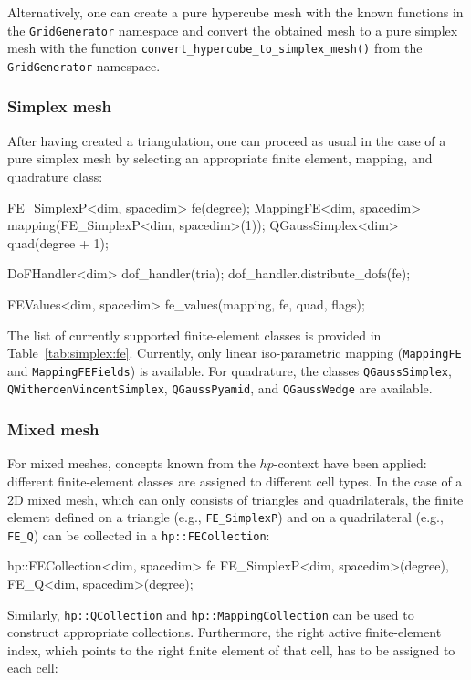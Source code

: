 \documentclass{ansarticle-preprint}
\begin{document}
Alternatively, one can create a pure hypercube mesh with the known functions
in the \texttt{GridGenerator} namespace and convert the obtained mesh to a
pure simplex mesh with the function 
\texttt{convert\_\allowbreak hypercube\_\allowbreak to\_\allowbreak simplex\_\allowbreak mesh()} from the \texttt{GridGenerator} namespace.

\subsubsection{Simplex mesh}

After having created a triangulation, one can proceed as usual in the case of
a pure simplex mesh by selecting an appropriate finite element, mapping, and
quadrature class:

\begin{c++}
FE_SimplexP<dim, spacedim> fe(degree);
MappingFE<dim, spacedim> mapping(FE_SimplexP<dim, spacedim>(1));
QGaussSimplex<dim> quad(degree + 1);

DoFHandler<dim> dof_handler(tria);
dof_handler.distribute_dofs(fe);

FEValues<dim, spacedim> fe_values(mapping, fe, quad, flags);
\end{c++}
The  list of currently supported finite-element classes is provided in Table~\ref{tab:simplex:fe}. Currently,
only linear iso-parametric mapping (\texttt{MappingFE} and \texttt{MappingFEFields}) is available. For quadrature, the classes \texttt{QGaussSimplex}, \texttt{QWitherdenVincentSimplex},  
\texttt{QGaussPyamid}, and \texttt{QGaussWedge} are
available.

\subsubsection{Mixed mesh}
For mixed meshes, concepts known from the $hp$-context have been applied: 
 different finite-element classes are assigned to different cell types. In the 
case of a 2D mixed mesh, which can only consists of triangles and
quadrilaterals, the finite element defined on a triangle (e.g., \texttt{FE\_SimplexP})
and on a quadrilateral (e.g., \texttt{FE\_Q}) can be collected in a \texttt{hp::FECollection}:

\begin{c++}  
hp::FECollection<dim, spacedim> fe
  {FE_SimplexP<dim, spacedim>(degree), FE_Q<dim, spacedim>(degree)};
\end{c++}

Similarly, \texttt{hp::QCollection} and \texttt{hp::MappingCollection} can be used
to construct appropriate collections. Furthermore, the right active finite-element index, which points to the right 
finite element of that cell, has to be assigned to each cell:
\end{document}
